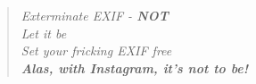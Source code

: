 \begin{verse}
\emph{Exterminate EXIF - \textbf{NOT}} \\
\emph{Let it be} \\
\emph{Set your fricking EXIF free} \\
\textbf{\emph{Alas, with Instagram, it's not to be!}} \\
\end{verse}



%